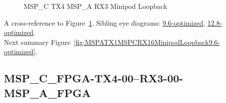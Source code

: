 \begin{figure}[h]
\begin{subfigure}{0.33\textwidth}
\hyperref[sec:MSPCFPGATX406RX306MSPAFPGA6.4-optimized]{}
\end{subfigure}\hspace*{\fill}
\begin{subfigure}{0.33\textwidth}
\hyperref[sec:MSPCFPGATX407RX307MSPAFPGA6.4-optimized]{}
\end{subfigure}\hspace*{\fill}
\begin{subfigure}{0.33\textwidth}
\hyperref[sec:MSPCFPGATX408RX308MSPAFPGA6.4-optimized]{}
\end{subfigure}

\begin{subfigure}{0.33\textwidth}
\hyperref[sec:MSPCFPGATX409RX309MSPAFPGA6.4-optimized]{}
\end{subfigure}\hspace*{\fill}
\begin{subfigure}{0.33\textwidth}
\hyperref[sec:MSPCFPGATX410RX310MSPAFPGA6.4-optimized]{}
\end{subfigure}\hspace*{\fill}
\begin{subfigure}{0.33\textwidth}
\hyperref[sec:MSPCFPGATX411RX311MSPAFPGA6.4-optimized]{}
\end{subfigure}

\caption{MSP\_C TX4 MSP\_A RX3 Minipod Loopback} \label{fig:MSPCTX4MSPARX3MinipodLoopback6.4-optimized}
\end{figure}

A cross-reference to Figure~\ref{fig:MSPCTX4MSPARX3MinipodLoopback6.4-optimized}.
Sibling eye diagrams: \hyperref[sec:MSPCTX4MSPARX3MinipodLoopback9.6-optimized]{9.6-optimized}, \hyperref[sec:MSPCTX4MSPARX3MinipodLoopback12.8-optimized]{12.8-optimized}. \\
Next summary Figure~\ref{fig:MSPATX1MSPCRX16MinipodLoopback9.6-optimized}.
\clearpage
% 
\subsection{MSP\_C\_FPGA-TX4-00--RX3-00-MSP\_A\_FPGA}\label{sec:MSPCFPGATX400RX300MSPAFPGA6.4-optimized}

